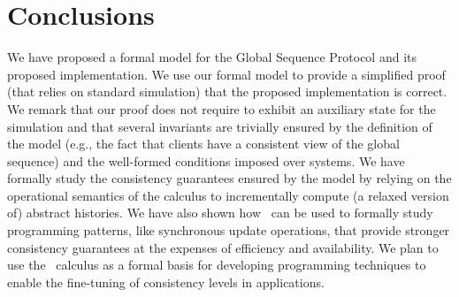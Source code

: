 
\section{Conclusions}
We have proposed a formal model for 
the Global Sequence Protocol and its proposed implementation. We use our formal model 
to provide  a 
simplified proof (that relies on standard  simulation) that the proposed implementation is 
correct. 
We remark that our proof does not require to exhibit an auxiliary state for the simulation  and 
that several 
invariants are trivially ensured by the definition of the model (e.g., the fact that clients have
a consistent view of the global sequence) and the well-formed conditions imposed over systems.  
We have formally study the consistency guarantees ensured by the model by relying on the 
 operational semantics of the calculus to incrementally compute (a relaxed version of) 
abstract histories. We  have also shown how  \gsp\ can be used to formally study programming patterns, 
like synchronous update operations, that provide stronger consistency guarantees at the expenses of efficiency 
and availability. We plan to use the \gsp\ calculus as a formal basis for 
developing programming techniques to enable the fine-tuning of consistency levels 
in applications. 
